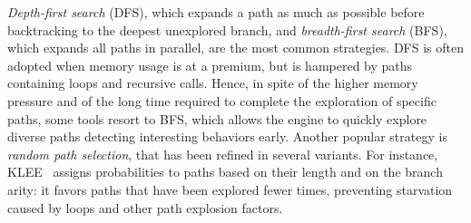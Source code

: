 
{\em Depth-first search} (DFS), which expands a path as much as possible before backtracking to the deepest unexplored branch, and {\em breadth-first search} (BFS), which expands all paths in parallel, are the most common strategies. DFS is often adopted when memory usage is at a premium, but is hampered by paths containing loops and recursive calls. Hence,  in spite of the higher memory pressure and of the long time required to complete the exploration of specific paths, some tools resort to BFS, which allows the engine to quickly explore diverse paths  detecting interesting behaviors early.  Another popular strategy is {\em random path selection}, that has been refined in several variants. For instance, {\sc KLEE}~\cite{KLEE-OSDI08} assigns probabilities to paths based on their length and on the branch arity: it favors paths that have been explored fewer times, preventing starvation caused by loops and other path explosion factors.

